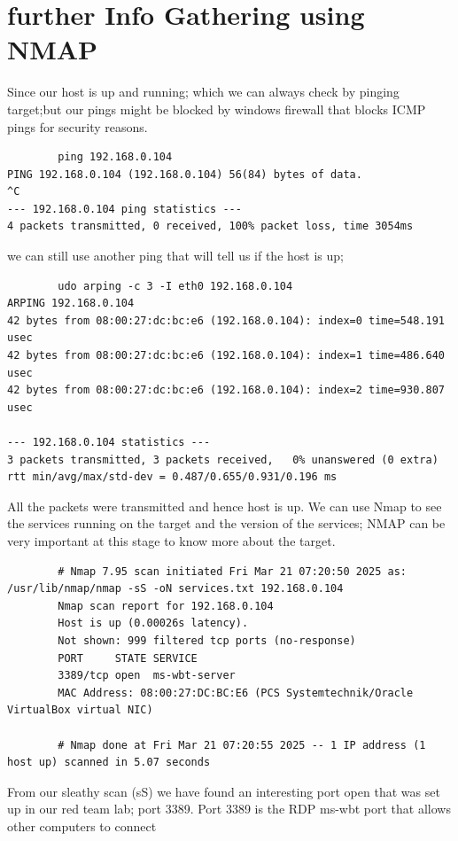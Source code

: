 \documentclass[a4paper,12pt]{article}
\begin{document}
\newpage{}
\section{further Info Gathering using NMAP}
Since our host is up and running; which we can always check by pinging target;but our pings might be blocked by windows firewall
that blocks ICMP pings for security reasons.
\begin{verbatim}
        ping 192.168.0.104
PING 192.168.0.104 (192.168.0.104) 56(84) bytes of data.
^C
--- 192.168.0.104 ping statistics ---
4 packets transmitted, 0 received, 100% packet loss, time 3054ms
\end{verbatim}
we can still use another ping that will tell us if the host is up;
\begin{verbatim}
        udo arping -c 3 -I eth0 192.168.0.104
ARPING 192.168.0.104
42 bytes from 08:00:27:dc:bc:e6 (192.168.0.104): index=0 time=548.191 usec
42 bytes from 08:00:27:dc:bc:e6 (192.168.0.104): index=1 time=486.640 usec
42 bytes from 08:00:27:dc:bc:e6 (192.168.0.104): index=2 time=930.807 usec

--- 192.168.0.104 statistics ---
3 packets transmitted, 3 packets received,   0% unanswered (0 extra)
rtt min/avg/max/std-dev = 0.487/0.655/0.931/0.196 ms

\end{verbatim}
All the packets were transmitted and hence host is up.
We can use Nmap to see the services running on the target and the version of the services; NMAP can be very important at this stage 
to know more about the target.
\begin{verbatim}
        # Nmap 7.95 scan initiated Fri Mar 21 07:20:50 2025 as: /usr/lib/nmap/nmap -sS -oN services.txt 192.168.0.104
        Nmap scan report for 192.168.0.104
        Host is up (0.00026s latency).
        Not shown: 999 filtered tcp ports (no-response)
        PORT     STATE SERVICE
        3389/tcp open  ms-wbt-server
        MAC Address: 08:00:27:DC:BC:E6 (PCS Systemtechnik/Oracle VirtualBox virtual NIC)
        
        # Nmap done at Fri Mar 21 07:20:55 2025 -- 1 IP address (1 host up) scanned in 5.07 seconds      
\end{verbatim}
From our sleathy scan (sS) we have found an interesting port open that was set up in our red team lab; port 3389.
Port 3389 is the RDP ms-wbt port that allows other computers to connect 
\end{document}
